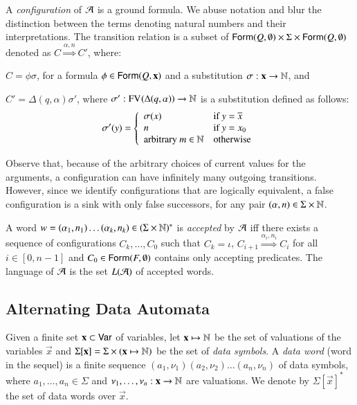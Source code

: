 \documentclass{llncs}
\begin{document}
A \emph{configuration} of $\mathcal{A}$ is a ground formula. We abuse notation
and blur the distinction between the terms denoting natural numbers
and their interpretations. The transition relation is a subset of
$\mathsf{Form}(Q,\emptyset) \times \Sigma \times \mathsf{Form}(Q,\emptyset)$ denoted
as \(C \stackrel{\alpha,n}{\Longrightarrow} C'\),
where: \begin{compactitem}
\item $C = \phi\sigma$, for a formula $\phi \in \mathsf{Form}(Q,\mathbf x)$ and
  a substitution $\sigma : \mathbf x \rightarrow {\bf \mathbb{N}}$, and
%
\item $C' = \Delta(q,\alpha)\sigma'$, where $\sigma' :
  \mathrm{FV}^{}(\Delta(q,\alpha)) \rightarrow {\bf \mathbb{N}}$ is a substitution defined
  as follows:
  \[\sigma'(y) = \left\{\begin{array}{ll}
  \sigma(x) & \text{if $y = \overline{x}$} \\
  n & \text{if $y = x_0$} \\
  \text{arbitrary $m \in {\bf \mathbb{N}}$} & \text{otherwise}
  \end{array}\right.\]
\end{compactitem}
Observe that, because of the arbitrary choices of current values for
the arguments, a configuration can have infinitely many outgoing
transitions. However, since we identify configurations that are
logically equivalent, a false configuration is a sink with only false
successors, for any pair $(\alpha,n) \in \Sigma \times {\bf \mathbb{N}}$. 

A word $w = (\alpha_1,n_1) \ldots (\alpha_k,n_k) \in (\Sigma \times
{\bf \mathbb{N}})^*$ is \emph{accepted} by $\mathcal{A}$ iff there exists a sequence of
configurations $C_k, \ldots, C_0$ such that $C_k = \iota$, $C_{i+1}
\stackrel{\alpha_i,n_i}{\Longrightarrow} C_i$ for all $i \in [0,n-1]$
and $C_0 \in \mathsf{Form}(F,\emptyset)$ contains only accepting
predicates. The language of $\mathcal{A}$ is the set $L(\mathcal{A})$ of accepted words.

\subsection{Alternating Data Automata}

Given a finite set $\mathbf x \subset \mathsf{Var}$ of variables, let $\mathbf x
\mapsto {\bf \mathbb{N}}$ be the set of valuations of the variables $\vec{x}$ and
$\Sigma[\mathbf x] = \Sigma \times (\mathbf x \mapsto {\bf \mathbb{N}})$ be the set of
\emph{data symbols}. A \emph{data word} (word in the sequel) is a
finite sequence $(a_1,\nu_1)(a_2,\nu_2) \ldots (a_n,\nu_n)$ of data
symbols, where $a_1,\ldots,a_n \in \Sigma$ and $\nu_1,\ldots,\nu_n :
\mathbf x \rightarrow {\bf \mathbb{N}}$ are valuations. We denote by
$\Sigma[\vec{x}]^*$ the set of data words over $\vec{x}$.
\end{document}
